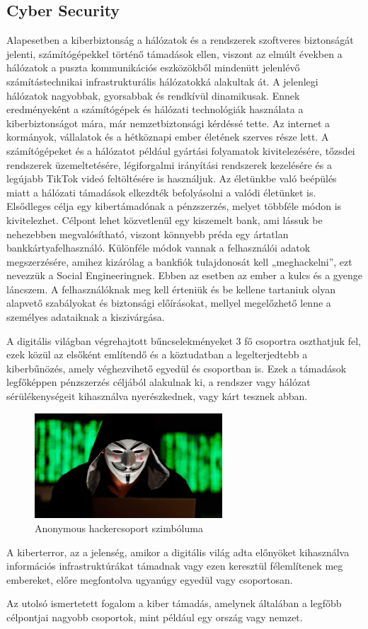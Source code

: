 \subsection{Cyber Security}
Alapesetben a kiberbiztonság a hálózatok és a rendszerek szoftveres biztonságát jelenti, számítógépekkel történő támadások ellen, viszont az elmúlt években a hálózatok a puszta kommunikációs eszközökből mindenütt jelenlévő számítástechnikai infrastrukturális hálózatokká alakultak át. A jelenlegi hálózatok nagyobbak, gyorsabbak és rendkívül dinamikusak. Ennek eredményeként a számítógépek és hálózati technológiák használata a kiberbiztonságot mára, már nemzetbiztonsági kérdéssé tette. Az internet a kormányok, vállalatok és a hétköznapi ember életének szerves része lett. A számítógépeket és a hálózatot például gyártási folyamatok kivitelezésére, tőzsdei rendszerek üzemeltetésére, légiforgalmi irányítási rendszerek kezelésére és a legújabb TikTok videó feltöltésére is használjuk. Az életünkbe való beépülés miatt a hálózati támadások elkezdték befolyásolni a valódi életünket is. Elsődleges célja egy kibertámadónak a pénzszerzés, melyet többféle módon is kivitelezhet. Célpont lehet közvetlenül egy kiszemelt bank, ami lássuk be nehezebben megvalósítható, viszont könnyebb préda egy ártatlan bankkártyafelhasználó. Különféle módok vannak a felhasználói adatok megszerzésére, amihez kizárólag a bankfiók tulajdonosát kell „meghackelni”, ezt nevezzük a Social Engineeringnek. Ebben az esetben az ember a kulcs és a gyenge láncszem. A felhasználóknak meg kell érteniük és be kellene tartaniuk olyan alapvető szabályokat és biztonsági előírásokat, mellyel megelőzhető lenne a személyes adataiknak a kiszivárgása. 
\par A digitális világban végrehajtott bűncselekményeket 3 fő csoportra oszthatjuk fel, ezek közül az elsőként említendő és a köztudatban a legelterjedtebb a kiberbűnözés, amely véghezvihető egyedül és csoportban is. Ezek a támadások legfőképpen pénzszerzés céljából alakulnak ki, a rendszer vagy hálózat sérülékenységeit kihasználva nyerészkednek, vagy kárt tesznek abban. 
\begin{figure}[!ht]
    \centering
    \includegraphics[width=70mm, keepaspectratio]{figures/274638343_482850443543049_4683554889010609984_n.jpg}
    \caption{Anonymous hackercsoport szimbóluma}
\end{figure}
\par A kiberterror, az a jelenség, amikor a digitális világ adta előnyöket kihasználva információs infrastruktúrákat támadnak vagy ezen keresztül félemlítenek meg embereket, előre megfontolva ugyanúgy egyedül vagy csoportosan.
\par Az utolsó ismertetett fogalom a kiber támadás, amelynek általában a legfőbb célpontjai nagyobb csoportok, mint például egy ország vagy nemzet.\cite{cybersecurity}
